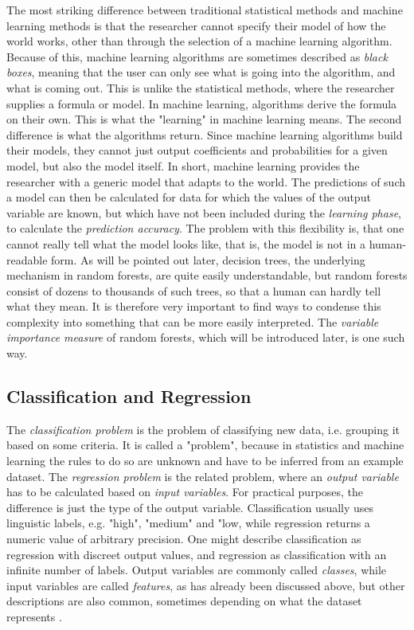 \documentclass[a4paper,man,12pt,apacite,floatsintext]{apa6} %
\begin{document}
The most striking difference between traditional statistical methods and
machine learning methods is that the researcher cannot specify their model of
how the world works, other than through the selection of a machine learning
algorithm.
Because of this, machine learning algorithms are sometimes described as
\emph{black boxes}, meaning that the user can only see what is going into the
algorithm, and what is coming out.
This is unlike the statistical methods, where the researcher supplies a
formula or model.
In machine learning, algorithms derive the formula on their own.
This is what the "learning" in machine learning means.
The second difference is what the algorithms return.
Since machine learning algorithms build their models,
they cannot just output coefficients and probabilities for a given model,
but also the model itself.
In short, machine learning provides the researcher with a generic model
that adapts to the world.
The predictions of such a model can then be calculated for data for which
the values of the output variable are known, but which have not
been included during the \emph{learning phase},
to calculate the \emph{prediction accuracy}.
The problem with this flexibility is, that one cannot really tell what the
model looks like, that is, the model is not in a human-readable form.
As will be pointed out later, decision trees, the underlying mechanism in
random forests, are quite easily understandable, but random forests
consist of dozens to thousands of such trees, so that a human can hardly
tell what they mean.
It is therefore very important to find ways to condense this complexity
into something that can be more easily interpreted.
The \emph{variable importance measure} of random forests, which will be introduced
later, is one such way.

\subsection{Classification and Regression}
The \emph{classification problem} is the problem of classifying new data,
i.e. grouping it based on some criteria.
It is called a "problem", because in statistics and machine learning the
rules to do so are unknown and have to be inferred from an example dataset.
The \emph{regression problem} is the related problem, where an
\emph{output variable} has to be calculated based on \emph{input variables}.
For practical purposes, the difference is just the type of the output variable.
Classification usually uses linguistic labels, e.g. "high", "medium" and "low,
while regression returns a numeric value of arbitrary precision.
One might describe classification as regression with discreet output values,
and regression as classification with an infinite number of labels.
Output variables are commonly called \emph{classes}, while input variables
are called \emph{features}, as has already been discussed above, but
other descriptions are also common, sometimes depending on what the dataset
represents \cite{strobl2009introduction}.
\end{document}
